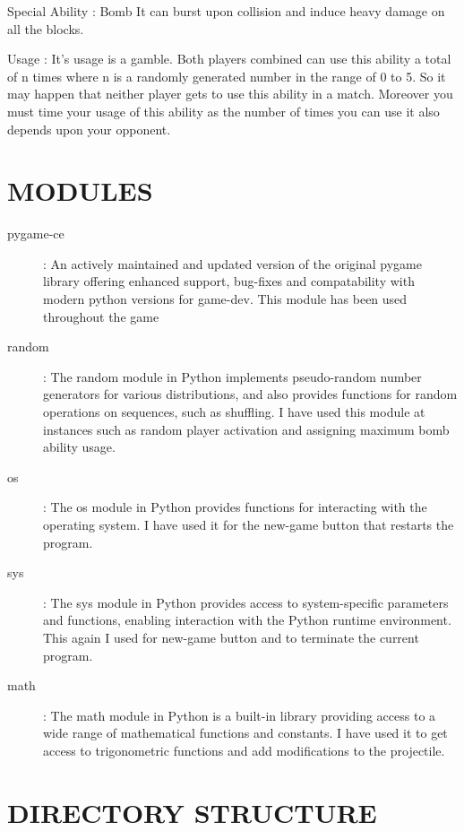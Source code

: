 \documentclass{article}
\begin{document}
Special Ability : Bomb
It can burst upon collision and induce heavy damage on all the blocks. 

Usage : It's usage is a gamble. Both players combined can use this ability a total of n times where n is a randomly generated number in the range of 0 to 5. So it may happen that neither player gets to use this ability in a match. Moreover you must time your usage of this ability as the number of times you can use it also depends upon your opponent.

\section{MODULES}
\begin{description}
    \item[pygame-ce]: An actively maintained and updated version of the original pygame library offering enhanced support, bug-fixes and compatability with modern python versions for game-dev. This module has been used throughout the game 
    \item[random]: The random module in Python implements pseudo-random number generators for various distributions, and also provides functions for random operations on sequences, such as shuffling. I have used this module at instances such as random player activation and assigning maximum bomb ability usage.
    \item[os]: The os module in Python provides functions for interacting with the operating system. I have used it for the new-game button that restarts the program.
    \item[sys]: The sys module in Python provides access to system-specific parameters and functions, enabling interaction with the Python runtime environment. This again I used for new-game button and to terminate the current program.
    \item[math]: The math module in Python is a built-in library providing access to a wide range of mathematical functions and constants. I have used it to get access to trigonometric functions and add modifications to the projectile. 
\end{description}

\section{DIRECTORY STRUCTURE}

\end{document}

